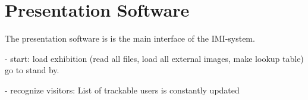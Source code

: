 %


\section{Presentation Software}
\label{implementation_presentation}

The presentation software is is the main interface of the \ac{IMI}-system.

- start: load exhibition (read all files, load all external images, make lookup table) go to stand by.

- recognize visitors: List of trackable users is constantly updated

